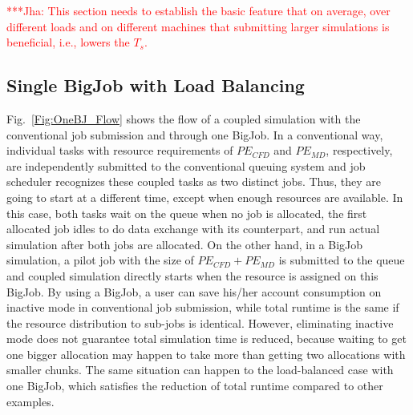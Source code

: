\documentclass[conference,final]{IEEEtran}
\newcommand{\jhanote}[1]{ {\textcolor{red} { ***Jha: #1 }}}
\newcommand{\jhanote}[1]{}
\newcommand{\ts}{$T_{s}$}
\begin{document}
\jhanote{This section needs to establish the basic feature that on
  average, over different loads and on different machines that
  submitting larger simulations is beneficial, i.e., lowers the \ts.}


\subsection{Single BigJob with Load Balancing}

Fig.~\ref{Fig:OneBJ_Flow} shows the flow of a coupled simulation with
the conventional job submission and through one BigJob. In a
conventional way, individual tasks with resource requirements of
$PE_{CFD}$ and $PE_{MD}$, respectively, are independently submitted to
the conventional queuing system and job scheduler recognizes these
coupled tasks as two distinct jobs. Thus, they are going to start at a
different time, except when enough resources are available. In this
case, both tasks wait on the queue when no job is allocated, the first
allocated job idles to do data exchange with its counterpart, and run
actual simulation after both jobs are allocated. On the other hand, in
a BigJob simulation, a pilot job with the size of $PE_{CFD}+PE_{MD}$
is submitted to the queue and coupled simulation directly starts when
the resource is assigned on this BigJob. By using a BigJob, a user can
save his/her account consumption on inactive mode in conventional job
submission, while total runtime is the same if the resource
distribution to sub-jobs is identical. However, eliminating inactive
mode does not guarantee total simulation time is reduced, because
waiting to get one bigger allocation may happen to take more than
getting two allocations with smaller chunks. The same situation can
happen to the load-balanced case with one BigJob, which satisfies the
reduction of total runtime compared to other examples.
\end{document}
